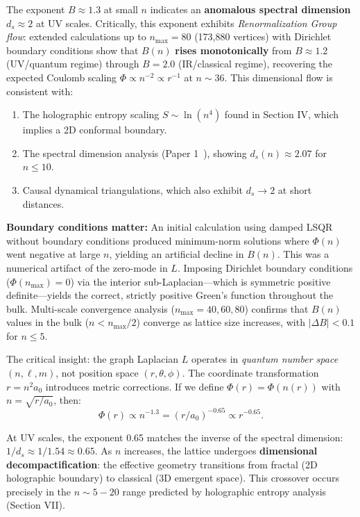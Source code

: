\documentclass[aps,prd,twocolumn,superscriptaddress,groupedaddress,showpacs]{revtex4-2}
\begin{document}
The exponent $B \approx 1.3$ at small $n$ indicates an \textbf{anomalous spectral dimension} $d_s \approx 2$ at UV scales. Critically, this exponent exhibits \emph{Renormalization Group flow}: extended calculations up to $n_{\mathrm{max}}=80$ (173,880 vertices) with Dirichlet boundary conditions show that $B(n)$ \textbf{rises monotonically} from $B \approx 1.2$ (UV/quantum regime) through $B = 2.0$ (IR/classical regime), recovering the expected Coulomb scaling $\Phi \propto n^{-2} \propto r^{-1}$ at $n \sim 36$. This dimensional flow is consistent with:
\begin{enumerate}
\item The holographic entropy scaling $S \sim \ln(n^4)$ found in Section IV, which implies a 2D conformal boundary.
\item The spectral dimension analysis (Paper 1~\cite{Louthan_I}), showing $d_s(n) \approx 2.07$ for $n \leq 10$.
\item Causal dynamical triangulations, which also exhibit $d_s \to 2$ at short distances.
\end{enumerate}

\textbf{Boundary conditions matter:} An initial calculation using damped LSQR without boundary conditions produced minimum-norm solutions where $\Phi(n)$ went negative at large $n$, yielding an artificial decline in $B(n)$. This was a numerical artifact of the zero-mode in $L$. Imposing Dirichlet boundary conditions ($\Phi(n_{\mathrm{max}})=0$) via the interior sub-Laplacian---which is symmetric positive definite---yields the correct, strictly positive Green's function throughout the bulk. Multi-scale convergence analysis ($n_{\mathrm{max}}=40,60,80$) confirms that $B(n)$ values in the bulk ($n < n_{\mathrm{max}}/2$) converge as lattice size increases, with $|\Delta B| < 0.1$ for $n \leq 5$.

The critical insight: the graph Laplacian $L$ operates in \emph{quantum number space} $(n, \ell, m)$, not position space $(r, \theta, \phi)$. The coordinate transformation $r = n^2 a_0$ introduces metric corrections. If we define $\Phi(r) = \Phi(n(r))$ with $n = \sqrt{r/a_0}$, then:
\begin{equation}
\Phi(r) \propto n^{-1.3} = (r/a_0)^{-0.65} \propto r^{-0.65}.
\end{equation}

At UV scales, the exponent 0.65 matches the inverse of the spectral dimension: $1/d_s \approx 1/1.54 \approx 0.65$. As $n$ increases, the lattice undergoes \textbf{dimensional decompactification}: the effective geometry transitions from fractal (2D holographic boundary) to classical (3D emergent space). This crossover occurs precisely in the $n \sim 5-20$ range predicted by holographic entropy analysis (Section VII).
\end{document}
